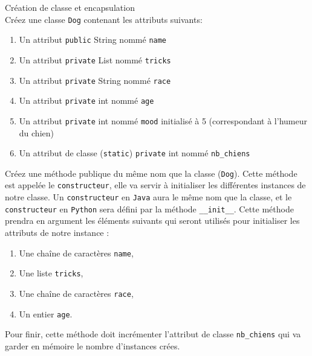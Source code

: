 \begin{Exercice}[10 minutes] Création de classe et encapsulation\\
    Créez une classe \lstinline{Dog} contenant les attributs suivants:
    \begin{enumerate}
    \item Un attribut \lstinline{public} String nommé \lstinline{name}
    \item Un attribut \lstinline{private} List nommé \lstinline{tricks}
    \item Un attribut \lstinline{private} String nommé \lstinline{race}
    \item Un attribut \lstinline{private} int nommé \lstinline{age}
    \item Un attribut \lstinline{private} int nommé \lstinline{mood} initialisé à 5 (correspondant à l'humeur du chien)
    \item Un attribut de classe (\lstinline{static}) \lstinline{private} int nommé \lstinline{nb_chiens}
   	\end{enumerate}
   	
   	Créez une méthode publique du même nom que la classe (\lstinline{Dog}). Cette méthode est appelée le \lstinline{constructeur}, elle va servir à initialiser les différentes instances de notre classe. Un \lstinline{constructeur} en \lstinline{Java} aura le même nom que la classe, et le \lstinline{constructeur} en \lstinline{Python} sera défini par la méthode \lstinline{__init__}. Cette méthode prendra en argument les éléments suivants qui seront utilisés pour initialiser les attributs de notre instance :
   	\begin{enumerate}
    \item Une chaîne de caractères \lstinline{name},
    \item Une liste \lstinline{tricks},
    \item Une chaîne de caractères \lstinline{race},
    \item Un entier \lstinline{age}.
   	\end{enumerate}
   	
   	Pour finir, cette méthode doit incrémenter l'attribut de classe \lstinline{nb_chiens} qui va garder en mémoire le nombre d'instances crées.
   	

\end{Exercice}


